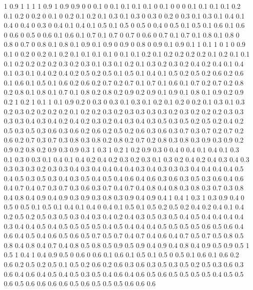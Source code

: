 1 0.9
1 1
1 1
0.9 1
0.9 0.9
0 0
0.1 0
0.1 0.1
0.1 0.1
0 0.1
0 0
0 0.1
0.1 0.1
0.1 0.2
0.1 0.2
0 0.2
0 0.1
0 0.2
0.1 0.2
0.1 0.3
0.1 0.3
0 0.3
0 0.2
0 0.3
0.1 0.3
0.1 0.4
0.1 0.4
0 0.4
0 0.3
0 0.4
0.1 0.4
0.1 0.5
0.1 0.5
0 0.5
0 0.4
0 0.5
0.1 0.5
0.1 0.6
0.1 0.6
0 0.6
0 0.5
0 0.6
0.1 0.6
0.1 0.7
0.1 0.7
0 0.7
0 0.6
0 0.7
0.1 0.7
0.1 0.8
0.1 0.8
0 0.8
0 0.7
0 0.8
0.1 0.8
0.1 0.9
0.1 0.9
0 0.9
0 0.8
0 0.9
0.1 0.9
0.1 1
0.1 1
0 1
0 0.9
0.1 0
0.2 0
0.2 0.1
0.2 0.1
0.1 0.1
0.1 0
0.1 0.1
0.2 0.1
0.2 0.2
0.2 0.2
0.1 0.2
0.1 0.1
0.1 0.2
0.2 0.2
0.2 0.3
0.2 0.3
0.1 0.3
0.1 0.2
0.1 0.3
0.2 0.3
0.2 0.4
0.2 0.4
0.1 0.4
0.1 0.3
0.1 0.4
0.2 0.4
0.2 0.5
0.2 0.5
0.1 0.5
0.1 0.4
0.1 0.5
0.2 0.5
0.2 0.6
0.2 0.6
0.1 0.6
0.1 0.5
0.1 0.6
0.2 0.6
0.2 0.7
0.2 0.7
0.1 0.7
0.1 0.6
0.1 0.7
0.2 0.7
0.2 0.8
0.2 0.8
0.1 0.8
0.1 0.7
0.1 0.8
0.2 0.8
0.2 0.9
0.2 0.9
0.1 0.9
0.1 0.8
0.1 0.9
0.2 0.9
0.2 1
0.2 1
0.1 1
0.1 0.9
0.2 0
0.3 0
0.3 0.1
0.3 0.1
0.2 0.1
0.2 0
0.2 0.1
0.3 0.1
0.3 0.2
0.3 0.2
0.2 0.2
0.2 0.1
0.2 0.2
0.3 0.2
0.3 0.3
0.3 0.3
0.2 0.3
0.2 0.2
0.2 0.3
0.3 0.3
0.3 0.4
0.3 0.4
0.2 0.4
0.2 0.3
0.2 0.4
0.3 0.4
0.3 0.5
0.3 0.5
0.2 0.5
0.2 0.4
0.2 0.5
0.3 0.5
0.3 0.6
0.3 0.6
0.2 0.6
0.2 0.5
0.2 0.6
0.3 0.6
0.3 0.7
0.3 0.7
0.2 0.7
0.2 0.6
0.2 0.7
0.3 0.7
0.3 0.8
0.3 0.8
0.2 0.8
0.2 0.7
0.2 0.8
0.3 0.8
0.3 0.9
0.3 0.9
0.2 0.9
0.2 0.8
0.2 0.9
0.3 0.9
0.3 1
0.3 1
0.2 1
0.2 0.9
0.3 0
0.4 0
0.4 0.1
0.4 0.1
0.3 0.1
0.3 0
0.3 0.1
0.4 0.1
0.4 0.2
0.4 0.2
0.3 0.2
0.3 0.1
0.3 0.2
0.4 0.2
0.4 0.3
0.4 0.3
0.3 0.3
0.3 0.2
0.3 0.3
0.4 0.3
0.4 0.4
0.4 0.4
0.3 0.4
0.3 0.3
0.3 0.4
0.4 0.4
0.4 0.5
0.4 0.5
0.3 0.5
0.3 0.4
0.3 0.5
0.4 0.5
0.4 0.6
0.4 0.6
0.3 0.6
0.3 0.5
0.3 0.6
0.4 0.6
0.4 0.7
0.4 0.7
0.3 0.7
0.3 0.6
0.3 0.7
0.4 0.7
0.4 0.8
0.4 0.8
0.3 0.8
0.3 0.7
0.3 0.8
0.4 0.8
0.4 0.9
0.4 0.9
0.3 0.9
0.3 0.8
0.3 0.9
0.4 0.9
0.4 1
0.4 1
0.3 1
0.3 0.9
0.4 0
0.5 0
0.5 0.1
0.5 0.1
0.4 0.1
0.4 0
0.4 0.1
0.5 0.1
0.5 0.2
0.5 0.2
0.4 0.2
0.4 0.1
0.4 0.2
0.5 0.2
0.5 0.3
0.5 0.3
0.4 0.3
0.4 0.2
0.4 0.3
0.5 0.3
0.5 0.4
0.5 0.4
0.4 0.4
0.4 0.3
0.4 0.4
0.5 0.4
0.5 0.5
0.5 0.5
0.4 0.5
0.4 0.4
0.4 0.5
0.5 0.5
0.5 0.6
0.5 0.6
0.4 0.6
0.4 0.5
0.4 0.6
0.5 0.6
0.5 0.7
0.5 0.7
0.4 0.7
0.4 0.6
0.4 0.7
0.5 0.7
0.5 0.8
0.5 0.8
0.4 0.8
0.4 0.7
0.4 0.8
0.5 0.8
0.5 0.9
0.5 0.9
0.4 0.9
0.4 0.8
0.4 0.9
0.5 0.9
0.5 1
0.5 1
0.4 1
0.4 0.9
0.5 0
0.6 0
0.6 0.1
0.6 0.1
0.5 0.1
0.5 0
0.5 0.1
0.6 0.1
0.6 0.2
0.6 0.2
0.5 0.2
0.5 0.1
0.5 0.2
0.6 0.2
0.6 0.3
0.6 0.3
0.5 0.3
0.5 0.2
0.5 0.3
0.6 0.3
0.6 0.4
0.6 0.4
0.5 0.4
0.5 0.3
0.5 0.4
0.6 0.4
0.6 0.5
0.6 0.5
0.5 0.5
0.5 0.4
0.5 0.5
0.6 0.5
0.6 0.6
0.6 0.6
0.5 0.6
0.5 0.5
0.5 0.6
0.6 0.6
